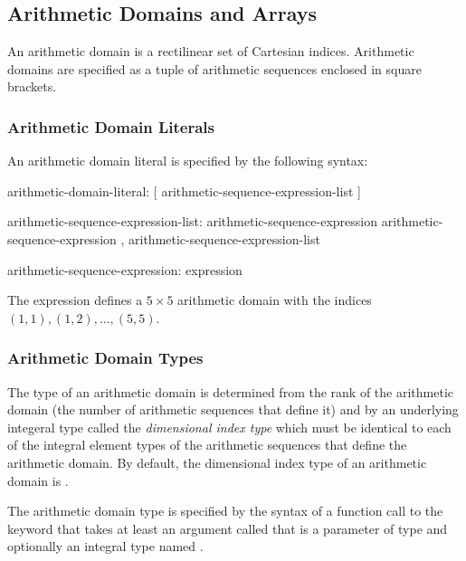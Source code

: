 \subsection{Arithmetic Domains and Arrays}
\label{Arithmetic_Domains_and_Arrays}

An arithmetic domain is a rectilinear set of Cartesian indices.
Arithmetic domains are specified as a tuple of arithmetic sequences
enclosed in square brackets.

\subsubsection{Arithmetic Domain Literals}
\label{Arithmetic_Domain_Literals}

An arithmetic domain literal is specified by the following syntax:
\begin{syntax}
arithmetic-domain-literal:
  [ arithmetic-sequence-expression-list ]

arithmetic-sequence-expression-list:
  arithmetic-sequence-expression
  arithmetic-sequence-expression , arithmetic-sequence-expression-list

arithmetic-sequence-expression:
  expression
\end{syntax}

\begin{example}
The expression \chpl{[1..5, 1..5]} defines a $5 \times 5$ arithmetic
domain with the indices $(1, 1), (1, 2), \ldots, (5, 5)$.
\end{example}

\subsubsection{Arithmetic Domain Types}
\label{Arithmetic_Domain_Types}

The type of an arithmetic domain is determined from the rank of the
arithmetic domain (the number of arithmetic sequences that define it)
and by an underlying integeral type called the {\em dimensional index
type} which must be identical to each of the integral element types of
the arithmetic sequences that define the arithmetic domain.  By
default, the dimensional index type of an arithmetic domain
is .

The arithmetic domain type is specified by the syntax of a function
call to the keyword  that takes at least an argument
called  that is a parameter of type  and
optionally an integral type named .

